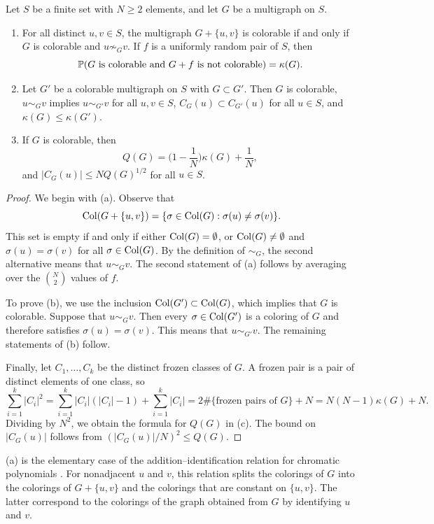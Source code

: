 \begin{lemma}\label{lem:pre-frozen}
Let $S$ be a finite set with $N \ge 2$ elements, and let $G$ be a multigraph on $S$.
\begin{enumerate}[label=(\alph*)]
\item For all distinct $u, v \in S$, the multigraph $G + \{u, v\}$ is colorable if and only if $G$ is colorable and $u \not \sim _G v$. If $f$ is a uniformly random pair of $S$, then
\[
\mathbb P(G \text{ is colorable and } G + f \text{ is not colorable}) = \kappa(G).
\]
\item Let $G'$ be a colorable multigraph on $S$ with $G \subset G'$. Then $G$ is colorable, $u \sim _G v$ implies $u \sim _{G'} v$ for all $u, v \in S$, $C_G(u) \subset C_{G'}(u)$ for all $u \in S$, and $\kappa(G) \le \kappa(G')$.
\item If $G$ is colorable, then
\[
Q(G) = \Big(1 - \frac 1N\Big) \kappa(G) + \frac 1N,
\]
and $|C_G(u)| \le N Q(G)^{1/2}$ for all $u \in S$.
\end{enumerate}
\end{lemma}

\begin{proof}
We begin with (a). Observe that
\[
\operatorname{Col}(G + \{u, v\}) = \{\sigma \in \operatorname{Col}(G) : \sigma(u) \neq \sigma(v)\}.
\]
This set is empty if and only if either $\operatorname{Col}(G) = \emptyset$, or $\operatorname{Col}(G) \neq \emptyset$ and $\sigma(u) = \sigma(v)$ for all $\sigma \in \operatorname{Col}(G)$. By the definition of $\sim _G$, the second alternative means that $u \sim _G v$. The second statement of (a) follows by averaging over the $\binom{N}{2}$ values of $f$.

To prove (b), we use the inclusion $\operatorname{Col}(G') \subset \operatorname{Col}(G)$, which implies that $G$ is colorable. Suppose that $u \sim _G v$. Then every $\sigma \in \operatorname{Col}(G')$ is a coloring of $G$ and therefore satisfies $\sigma(u) = \sigma(v)$. This means that $u \sim _{G'} v$. The remaining statements of (b) follow.

Finally, let $C_1, \dots, C_k$ be the distinct frozen classes of $G$. A frozen pair is a pair of distinct elements of one class, so
\[
\sum_{i = 1}^k |C_i|^2 = \sum_{i = 1}^k |C_i| (|C_i| - 1) + \sum_{i = 1}^k |C_i| = 2 \#\{\text{frozen pairs of } G\} + N = N (N - 1) \kappa(G) + N.
\]
Dividing by $N^2$, we obtain the formula for $Q(G)$ in (c). The bound on $|C_G(u)|$ follows from $(|C_G(u)|/N)^2 \le Q(G)$.
\end{proof}

(a) is the elementary case of the addition--identification relation for chromatic polynomials \cite[Section~3, Theorem~1]{read1968introduction}. For nonadjacent $u$ and $v$, this relation splits the colorings of $G$ into the colorings of $G + \{u, v\}$ and the colorings that are constant on $\{u, v\}$. The latter correspond to the colorings of the graph obtained from $G$ by identifying $u$ and $v$.

